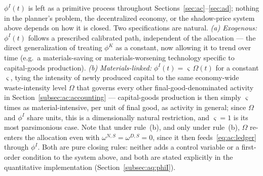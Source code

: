 \begin{remark}\label{rem:ac:phiI}
$\phi^I(t)$ is left as a primitive process throughout Sections~\ref{sec:ac}--\ref{sec:ad}; nothing in the planner's problem, the decentralized economy, or the shadow-price system above depends on how it is closed. Two specifications are natural. \emph{(a) Exogenous:} $\phi^I(t)$ follows a prescribed calibrated path, independent of the allocation --- the direct generalization of treating $\phi^K$ as a constant, now allowing it to trend over time (e.g.\ a materials-saving or materials-worsening technology specific to capital-goods production). \emph{(b) Materials-linked:} $\phi^I(t)=\varsigma\,\Omega(t)$ for a constant $\varsigma$, tying the intensity of newly produced capital to the same economy-wide waste-intensity level $\Omega$ that governs every other final-good-denominated activity in Section~\ref{subsec:ac:accounting} --- capital-goods production is then simply $\varsigma$ times as material-intensive, per unit of final good, as activity in general; since $\Omega$ and $\phi^I$ share units, this is a dimensionally natural restriction, and $\varsigma=1$ is its most parsimonious case. Note that under rule~(b), and only under rule~(b), $\Omega$ re-enters the allocation even with $\omega^{N,S}=\omega^{D,S}=0$, since it then feeds~\eqref{eq:ac:ledger} through $\phi^I$. Both are pure closing rules: neither adds a control variable or a first-order condition to the system above, and both are stated explicitly in the quantitative implementation (Section~\ref{subsec:aq:phiI}).
\end{remark}
